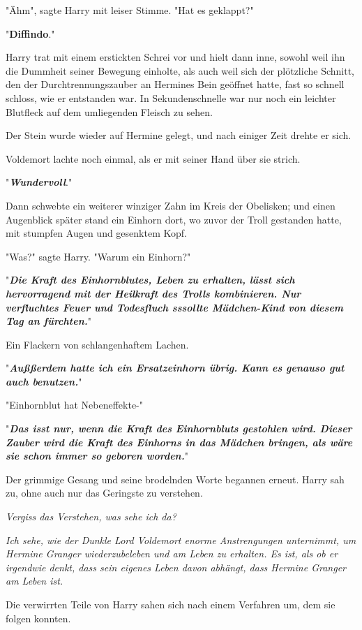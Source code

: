 {"Ähm", sagte Harry mit leiser Stimme. "Hat es geklappt?"

"\textbf{Diffindo}."

Harry trat mit einem erstickten Schrei vor und hielt dann inne, sowohl weil ihn die Dummheit seiner Bewegung einholte, als auch weil sich der plötzliche Schnitt, den der Durchtrennungszauber an Hermines Bein geöffnet hatte, fast so schnell schloss, wie er entstanden war. In Sekundenschnelle war nur noch ein leichter Blutfleck auf dem umliegenden Fleisch zu sehen.

Der Stein wurde wieder auf Hermine gelegt, und nach einiger Zeit drehte er sich.

Voldemort lachte noch einmal, als er mit seiner Hand über sie strich.

"\textbf{\emph{Wundervoll}}."

Dann schwebte ein weiterer winziger Zahn im Kreis der Obelisken; und einen Augenblick später stand ein Einhorn dort, wo zuvor der Troll gestanden hatte, mit stumpfen Augen und gesenktem Kopf.

"Was?" sagte Harry. "Warum ein Einhorn?"

"\textbf{\emph{Die Kraft des Einhornblutes, Leben zu erhalten, lässt sich hervorragend mit der Heilkraft des Trolls kombinieren. Nur verfluchtes Feuer und Todesfluch sssollte Mädchen-Kind von diesem Tag an fürchten.}}"

Ein Flackern von schlangenhaftem Lachen.

"\textbf{\emph{Außßerdem hatte ich ein Ersatzeinhorn übrig. Kann es genauso gut auch benutzen.}}"

"Einhornblut hat Nebeneffekte-"

"\textbf{\emph{Das isst nur, wenn die Kraft des Einhornbluts gestohlen wird. Dieser Zauber wird die Kraft des Einhorns in das Mädchen bringen, als wäre sie schon immer so geboren worden.}}"

Der grimmige Gesang und seine brodelnden Worte begannen erneut. Harry sah zu, ohne auch nur das Geringste zu verstehen.

\emph{Vergiss das Verstehen, was sehe ich da?}

\emph{Ich sehe, wie der Dunkle Lord Voldemort enorme Anstrengungen unternimmt, um Hermine Granger wiederzubeleben und am Leben zu erhalten. Es ist, als ob er irgendwie denkt, dass sein eigenes Leben davon abhängt, dass Hermine Granger am Leben ist.}

Die verwirrten Teile von Harry sahen sich nach einem Verfahren um, dem sie folgen konnten.

}
